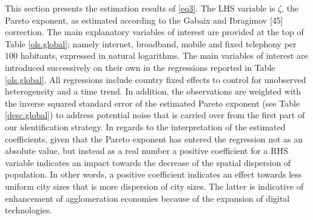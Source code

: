 \documentclass[10pt,letterpaper]{article}
\begin{document}
This section presents the estimation results of \ref{eq3}. The LHS
variable is \(\zeta\), the Pareto exponent, \color{black} as estimated
according to the Gabaix and Ibragimov {[}45{]} correction. The main
explanatory variables of interest are provided at the top of Table
\ref{ols.global}; namely internet, broadband, mobile and fixed telephony
per \(100\) habitants, expressed in natural logarithms. The main
variables of interest are introduced successively on their own in the
regressions reported in Table \ref{ols.global}. All regressions include
country fixed effects to control for unobserved heterogeneity and a time
trend. In addition, the observations are weighted with the inverse
squared standard error of the estimated Pareto exponent \color{black}
(see Table \ref{desc.global}) to address potential noise that is carried
over from the first part of our identification strategy. In regards to
the interpretation of the estimated coefficients, given that the Pareto
exponent \color{black} has entered the regression not as an absolute
value, but instead as a real number a positive coefficient for a RHS
variable indicates an impact towards the decrease of the spatial
dispersion of population. In other words, a positive coefficient
indicates an effect towards less uniform city sizes that is more
dispersion of city sizes. The latter is indicative of enhancement of
agglomeration economies because of the expansion of digital
technologies.
\end{document}
